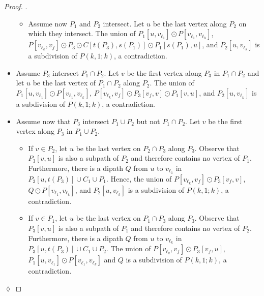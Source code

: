 \documentclass[utf8,10pt]{article}
\theoremstyle{plain}
\theoremstyle{definition}
\theoremstyle{remark}
\newenvironment{subproof}{\par\noindent {\it Subproof}.\ }{\hfill$\lozenge$\par\vspace{11pt}}
\begin{document}
\begin{proof}
\begin{subproof}
\begin{itemize}
\begin{itemize}
		\item Assume now $P_1$ and $P_2$ intersect. Let $u$ be the last vertex along $P_2$ on which they intersect. The union of $P_1[u,v_{\ell_1}]\odot P[v_{\ell_1}, v_{\ell_k}]$, $P[v_{\ell_k}, v_f]\odot P_3\odot C[t(P_3), s(P_1)]\odot P_1[s(P_1), u]$, and $P_2[u, v_{\ell_k}]$ is a subdivision of $P(k,1;k)$, a contradiction.
	\end{itemize}

	\item Assume $P_3$ intersect $P_1\cap P_2$. Let $v$ be the first vertex along $P_3$ in $P_1\cap P_2$ and let $u$ be the last vertex of $P_1\cap P_2$ along $P_2$. The union of $P_1[u,v_{\ell_1}]\odot P[v_{\ell_1}, v_{\ell_k}]$, $P[v_{\ell_k}, v_f]\odot P_3[v_f,v]\odot P_1[v, u]$, and $P_2[u, v_{\ell_k}]$ is a subdivision of $P(k,1;k)$, a contradiction.

	\item Assume now that $P_3$ intersect $P_1\cup P_2$ but not $P_1\cap P_2$. Let $v$ be the first vertex along $P_3$ in $P_1\cup P_2$.
	\begin{itemize}
	\item If $v \in P_2$, let $u$ be the last vertex on $P_2\cap P_3$ along $P_3$. Observe that $P_3[v,u]$ is also a subpath of $P_2$ and therefore contains no vertex of $P_1$. Furthermore, there is a dipath $Q$ from $u$ to $v_{\ell_1}$ in $P_3[u, t(P_3)]\cup C_1\cup  P_1$. Hence, the union of $P[v_{\ell_k}, v_f] \odot P_3[v_f,v]$, $Q\odot P[v_{\ell_1},v_{\ell_k}]$, and $P_2[u,v_{\ell_k}]$ is a subdivision of $P(k,1;k)$, a contradiction.
	
	\item If $v\in P_1$, let $u$ be the last vertex on $P_1\cap P_3$ along $P_3$.  Observe that $P_3[v,u]$ is also a subpath of $P_1$ and therefore contains no vertex of $P_2$. Furthermore, there is a dipath $Q$ from $u$ to $v_{\ell_k}$ in $P_3[u, t(P_3)]\cup C_1\cup  P_2$.
	The union of $P[v_{\ell_k}, v_f] \odot P_3[v_f,u]$, $P_1[u, v_{\ell_1}]\odot P[v_{\ell_1}, v_{\ell_k}]$ and $Q$ is a subdivision of $P(k,1;k)$, a contradiction.

	\end{itemize}

\end{itemize}
\end{subproof}
\end{proof}
\end{document}
